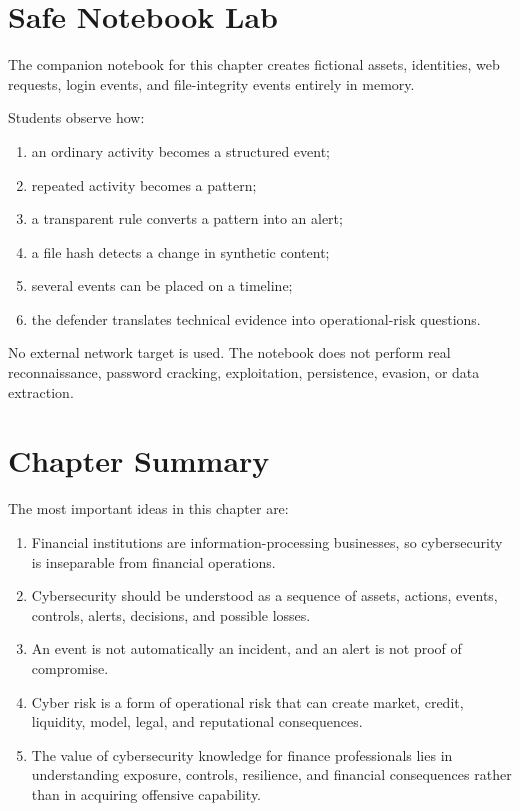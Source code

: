 \section{Safe Notebook Lab}

\begin{notebooklab}
The companion notebook for this chapter creates fictional assets, identities, web requests, login events, and file-integrity events entirely in memory.

Students observe how:
\begin{enumerate}
    \item an ordinary activity becomes a structured event;
    \item repeated activity becomes a pattern;
    \item a transparent rule converts a pattern into an alert;
    \item a file hash detects a change in synthetic content;
    \item several events can be placed on a timeline;
    \item the defender translates technical evidence into operational-risk questions.
\end{enumerate}

No external network target is used. The notebook does not perform real reconnaissance, password cracking, exploitation, persistence, evasion, or data extraction.
\end{notebooklab}

\section{Chapter Summary}

The most important ideas in this chapter are:

\begin{enumerate}
    \item Financial institutions are information-processing businesses, so cybersecurity is inseparable from financial operations.
    \item Cybersecurity should be understood as a sequence of assets, actions, events, controls, alerts, decisions, and possible losses.
    \item An event is not automatically an incident, and an alert is not proof of compromise.
    \item Cyber risk is a form of operational risk that can create market, credit, liquidity, model, legal, and reputational consequences.
    \item The value of cybersecurity knowledge for finance professionals lies in understanding exposure, controls, resilience, and financial consequences rather than in acquiring offensive capability.
\end{enumerate}

